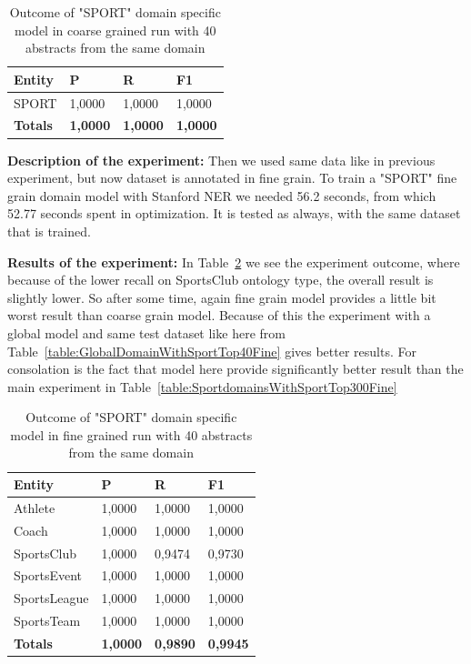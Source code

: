 \documentclass[thesis=M,english]{FITthesis}[2018/05/30]
\begin{document}
	\begin{table}[H]\centering
		\begin{tabular}{|l|l|l|l|}
			\hline {\textbf{Entity}} & {\textbf{P}} & {\textbf{R}} & {\textbf{F1}}\\\hline
				SPORT & 1,0000 & 1,0000 & 1,0000\\\hline
				\textbf{Totals} & \textbf{1,0000} & \textbf{1,0000} & \textbf{1,0000}\\\hline
		\end{tabular}
		\caption{Outcome of "SPORT" domain specific model in coarse grained run with 40 abstracts from the same domain \label{table:SportDomainWithSportTop40Coarse}}
	\end{table}


	\textbf{Description of the experiment:} Then we used same data like in previous experiment, but now dataset is annotated in fine grain. To train a "SPORT" fine grain domain model with Stanford NER we needed 56.2 seconds, from which 52.77 seconds spent in optimization. It is tested as always, with the same dataset that is trained.

	\textbf{Results of the experiment:} In Table~\ref{table:SportDomainWithSportTop40Fine} we see the experiment outcome, where because of the lower recall on SportsClub ontology type, the overall result is slightly lower. So after some time, again fine grain model provides a little bit worst result than coarse grain model. Because of this the experiment with a global model and same test dataset like here from Table~\ref{table:GlobalDomainWithSportTop40Fine} gives better results. For consolation is the fact that model here provide significantly better result than the main experiment in Table~\ref{table:SportdomainsWithSportTop300Fine}

	\begin{table}[H]\centering
		\begin{tabular}{|l|l|l|l|}
			\hline {\textbf{Entity}} & {\textbf{P}} & {\textbf{R}} & {\textbf{F1}}\\\hline
				Athlete & 1,0000 & 1,0000 & 1,0000\\
				Coach & 1,0000 & 1,0000 & 1,0000\\
				SportsClub & 1,0000 & 0,9474 & 0,9730\\
				SportsEvent & 1,0000 & 1,0000 & 1,0000\\
				SportsLeague & 1,0000 & 1,0000 & 1,0000\\
				SportsTeam & 1,0000 & 1,0000 & 1,0000\\\hline
				\textbf{Totals} & \textbf{1,0000} & \textbf{0,9890} & \textbf{0,9945}\\\hline
		\end{tabular}
		\caption{Outcome of "SPORT" domain specific model in fine grained run with 40 abstracts from the same domain \label{table:SportDomainWithSportTop40Fine}}
	\end{table}	
\end{document}
